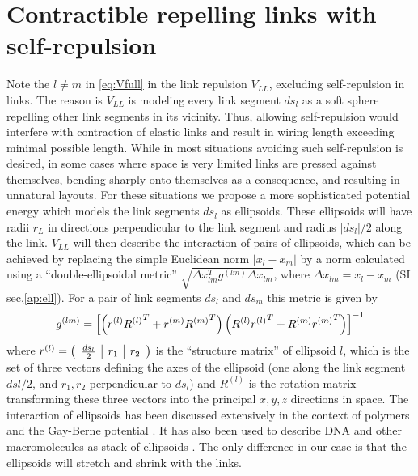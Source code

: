 \documentclass[nofootinbib,preprint,floatfix,titlepage,endfloats,superscriptaddress]{revtex4} %
\begin{document}
\section{Contractible repelling links with self-repulsion\label{ap:ell}}
Note the $l\ne m $ in \eqref{eq:Vfull} in the link repulsion $V_{LL}$, excluding self-repulsion in links. 
The reason is $V_{LL}$ is modeling every link segment $ds_l$ as a soft sphere repelling other link segments in its vicinity.
Thus, allowing self-repulsion would interfere with contraction of elastic links and result in wiring length exceeding minimal possible length. 
While in most situations avoiding such self-repulsion is desired, in some cases where space is very limited links are pressed against themselves, bending sharply onto themselves as a consequence, and resulting in unnatural layouts. 
For these situations we propose a more sophisticated potential energy which models the link segments $ds_l$ as ellipsoids. 
These ellipsoids will have radii $r_L$ in directions perpendicular to the link segment and radius $|ds_l|/2$ along the link. 
$V_{LL}$ will then describe the interaction of pairs of ellipsoids, which can be achieved by replacing the simple Euclidean norm $|x_l-x_m|%
$ by a norm calculated using a ``double-ellipsoidal metric'' $\sqrt{\Delta x_{lm}^Tg^{(lm)}\Delta x_{lm}}$, where $\Delta x_{lm} = x_l-x_m$ (SI sec.\ref{ap:ell}). 
For a pair of link segments $ds_l$ and $ds_m$ this metric is given by 
\begin{align}
    g^{(lm)} = \left[\left(r^{(l)}{R^{(l)}}^T+ r^{(m)}{R^{(m)}}^T\right) \left(R^{(l)}{r^{(l)}}^T+ R^{(m)}{r^{(m)}}^T\right) \right]^{-1}
    \label{eq:g-ell}
\end{align}
where $r^{(l)} = \left(\begin{array}{c|c|c}{ds_l\over2} & r_{1} &r_{2}\end{array}
    \right)$ 
is the ``structure matrix'' of ellipsoid $l$, which is the set of three vectors defining the axes of the ellipsoid (one along the link segment $dsl/2$, and $r_1, r_2$ perpendicular to $ds_l$) and $R^{(l)}$ is the rotation matrix transforming these three vectors into the principal $x,y,z$ directions in space. 
The interaction of ellipsoids has been discussed extensively in the context of polymers and the Gay-Berne potential \citep{gay1981modification,berne1972gaussian,everaers2003interaction}. 
It has also been used to describe DNA and other macromolecules as stack of ellipsoids \citep{babadi2006coarse,mergell2003modeling,cleaver1996extension}.
The only difference in our case is that the ellipsoids will stretch and shrink with the links. 
\end{document}
